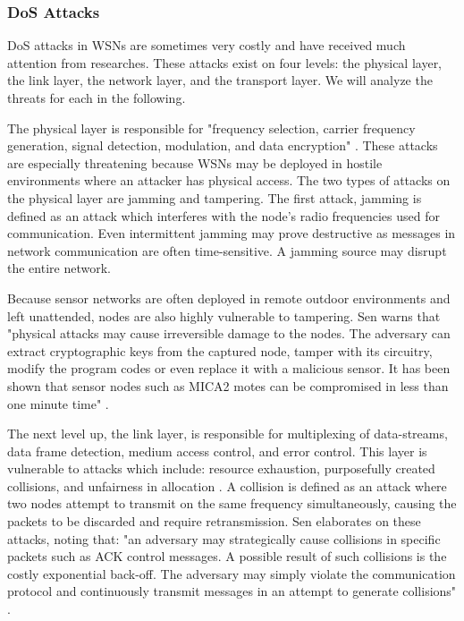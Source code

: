 \documentclass[12pt,a4paper,twoside]{report}
\begin{document}
\subsubsection{DoS Attacks}
DoS attacks in WSNs are sometimes very costly and have received much attention from researches. These attacks exist on four levels: the physical layer, the link layer, the network layer, and the transport layer. We will analyze the threats for each in the following. \par\par
The physical layer is responsible for "frequency selection, carrier frequency generation, signal detection, modulation, and data encryption" \cite{sen:2009}. These attacks are especially threatening because WSNs may be deployed in hostile environments where an attacker has physical access. The two types of attacks on the physical layer are jamming and tampering. The first attack, jamming is defined as an attack which interferes with the node's radio frequencies used for communication. Even intermittent jamming may prove destructive as messages in network communication are often time-sensitive.  A jamming source may disrupt the entire network. \par
Because sensor networks are often deployed in remote outdoor environments and left unattended, nodes are also highly vulnerable to tampering. Sen warns that "physical attacks may cause irreversible damage to the nodes. The adversary can extract cryptographic keys from the captured node, tamper with its circuitry, modify the program codes or even replace it with a malicious sensor. It has been shown that sensor nodes such as MICA2 motes can be compromised in less than one minute time" \cite{sen:2009}.  \par\par
The next level up, the link layer, is responsible for multiplexing of data-streams, data frame detection, medium access control, and error control. This layer is vulnerable to attacks which include: resource exhaustion, purposefully created collisions, and unfairness in allocation \cite{sen:2009}. A collision is defined as an attack where two nodes attempt to transmit on the same frequency simultaneously, causing the packets to be discarded and require retransmission. Sen elaborates on these attacks, noting that: "an adversary may strategically cause collisions in specific packets such as ACK control messages. A possible result of such collisions is the costly exponential back-off. The adversary may simply violate the communication protocol and continuously transmit messages in an attempt to generate collisions" \cite{sen:2009}. \par
\end{document}
